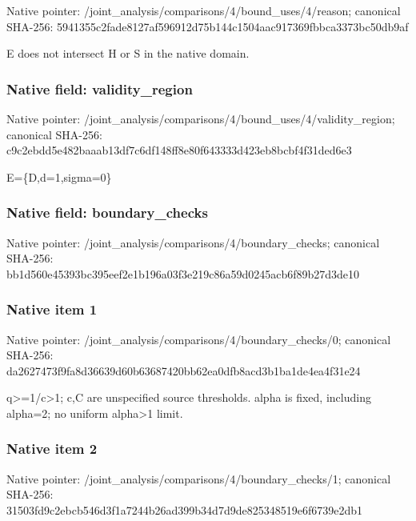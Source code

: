 \documentclass[10pt,a4paper]{article}
\begin{document}
Native pointer: /joint\_analysis/comparis\allowbreak{}ons/4/bound\_uses/4/reaso\allowbreak{}n; canonical SHA-256: 5941355c2fade8127af59691\allowbreak{}2d75b144c1504aac917369fb\allowbreak{}bca3373bc50db9af


E does not intersect H or S in the native domain.


\subsubsection{Native field: validity\_region}


Native pointer: /joint\_analysis/comparis\allowbreak{}ons/4/bound\_uses/4/valid\allowbreak{}ity\_region; canonical SHA-256: c9c2ebdd5e482baaab13df7c\allowbreak{}6df148ff8e80f643333d423e\allowbreak{}b8bcbf4f31ded6e3


E=\{D,d=1,sigma=0\}


\subsubsection{Native field: boundary\_checks}


Native pointer: /joint\_analysis/comparis\allowbreak{}ons/4/boundary\_checks; canonical SHA-256: bb1d560e45393bc395eef2e1\allowbreak{}b196a03f3e219c86a59d0245\allowbreak{}acb6f89b27d3de10



\subsubsection{Native item 1}


Native pointer: /joint\_analysis/comparis\allowbreak{}ons/4/boundary\_checks/0; canonical SHA-256: da2627473f9fa8d36639d60b\allowbreak{}63687420bb62ea0dfb8acd3b\allowbreak{}1ba1de4ea4f31e24


q>=1/c>1; c,C are unspecified source thresholds. alpha is fixed, including alpha=2; no uniform alpha>1 limit.


\subsubsection{Native item 2}


Native pointer: /joint\_analysis/comparis\allowbreak{}ons/4/boundary\_checks/1; canonical SHA-256: 31503fd9c2ebcb546d3f1a72\allowbreak{}44b26ad399b34d7d9de82534\allowbreak{}8519e6f6739e2db1
\end{document}
